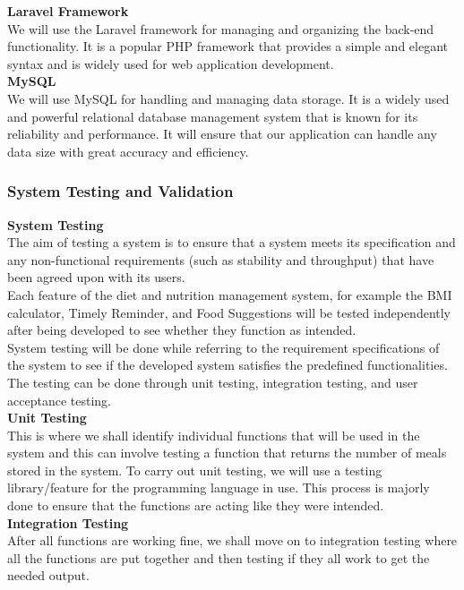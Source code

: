 \documentclass {article}
\begin{document}
\noindent \textbf{Laravel Framework\\}
\noindent We will use the Laravel framework for managing and organizing the back-end functionality. It is a popular PHP framework that provides a simple and elegant syntax and is widely used for web application development.\\

\noindent \textbf{MySQL\\}
We will use MySQL for handling and managing data storage. It is a widely used and powerful relational database management system that is known for its reliability and performance. It will ensure that our application can handle any data size with great accuracy and efficiency.


\subsubsection{System Testing and Validation}
\noindent \textbf{System Testing \\}
\noindent The aim of testing a system is to ensure that a system meets its specification and any non-functional requirements (such as stability and throughput) that have been agreed upon with its users.\\

\noindent Each feature of the diet and nutrition management system, for example the BMI calculator, Timely Reminder, and Food Suggestions will be tested independently after being developed to see whether they function as intended.\\

\noindent System testing will be done while referring to the requirement specifications of the system to see if the developed system satisfies the predefined functionalities. The testing can be done through unit testing, integration testing, and user acceptance testing. \\

\noindent \textbf{Unit Testing \\}
\noindent This is where we shall identify individual functions that will be used in the system and this can involve testing a function that returns the number of meals stored in the system. To carry out unit testing, we will use a testing library/feature for the programming language in use. This process is majorly done to ensure that the functions are acting like they were intended. \\

\noindent \textbf{Integration Testing \\}
\noindent After all functions are working fine, we shall move on to integration testing where all the functions are put together and then testing if they all work to get the needed output.\\
\end{document}

